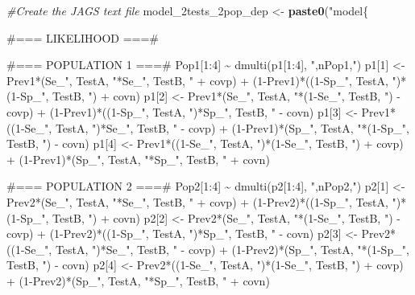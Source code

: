\documentclass[
]{book}
\newenvironment{Shaded}{\begin{snugshade}}{\end{snugshade}}
\newcommand{\CommentTok}[1]{\textcolor[rgb]{0.56,0.35,0.01}{\textit{#1}}}
\newcommand{\FunctionTok}[1]{\textcolor[rgb]{0.13,0.29,0.53}{\textbf{#1}}}
\newcommand{\NormalTok}[1]{#1}
\newcommand{\OtherTok}[1]{\textcolor[rgb]{0.56,0.35,0.01}{#1}}
\newcommand{\StringTok}[1]{\textcolor[rgb]{0.31,0.60,0.02}{#1}}
\begin{document}
\begin{Shaded}
\begin{Highlighting}[]
\CommentTok{\#Create the JAGS text file}
\NormalTok{model\_2tests\_2pop\_dep }\OtherTok{\textless{}{-}} \FunctionTok{paste0}\NormalTok{(}\StringTok{"model\{}

\StringTok{\#=== LIKELIHOOD ===\#}

\StringTok{  \#=== POPULATION 1 ===\#}
\StringTok{  Pop1[1:4] \textasciitilde{} dmulti(p1[1:4], "}\NormalTok{,nPop1,}\StringTok{")}
\StringTok{  p1[1] \textless{}{-} Prev1*(Se\_"}\NormalTok{, TestA, }\StringTok{"*Se\_"}\NormalTok{, TestB, }\StringTok{" + covp) + (1{-}Prev1)*((1{-}Sp\_"}\NormalTok{, TestA, }\StringTok{")*(1{-}Sp\_"}\NormalTok{, TestB, }\StringTok{") + covn)}
\StringTok{  p1[2] \textless{}{-} Prev1*(Se\_"}\NormalTok{, TestA, }\StringTok{"*(1{-}Se\_"}\NormalTok{, TestB, }\StringTok{") {-} covp) + (1{-}Prev1)*((1{-}Sp\_"}\NormalTok{, TestA, }\StringTok{")*Sp\_"}\NormalTok{, TestB, }\StringTok{" {-} covn)}
\StringTok{  p1[3] \textless{}{-} Prev1*((1{-}Se\_"}\NormalTok{, TestA, }\StringTok{")*Se\_"}\NormalTok{, TestB, }\StringTok{" {-} covp) + (1{-}Prev1)*(Sp\_"}\NormalTok{, TestA, }\StringTok{"*(1{-}Sp\_"}\NormalTok{, TestB, }\StringTok{") {-} covn)}
\StringTok{  p1[4] \textless{}{-} Prev1*((1{-}Se\_"}\NormalTok{, TestA, }\StringTok{")*(1{-}Se\_"}\NormalTok{, TestB, }\StringTok{") + covp) + (1{-}Prev1)*(Sp\_"}\NormalTok{, TestA, }\StringTok{"*Sp\_"}\NormalTok{, TestB, }\StringTok{" + covn)}

\StringTok{  \#=== POPULATION 2 ===\#  }
\StringTok{  Pop2[1:4] \textasciitilde{} dmulti(p2[1:4], "}\NormalTok{,nPop2,}\StringTok{")}
\StringTok{  p2[1] \textless{}{-} Prev2*(Se\_"}\NormalTok{, TestA, }\StringTok{"*Se\_"}\NormalTok{, TestB, }\StringTok{" + covp) + (1{-}Prev2)*((1{-}Sp\_"}\NormalTok{, TestA, }\StringTok{")*(1{-}Sp\_"}\NormalTok{, TestB, }\StringTok{") + covn)}
\StringTok{  p2[2] \textless{}{-} Prev2*(Se\_"}\NormalTok{, TestA, }\StringTok{"*(1{-}Se\_"}\NormalTok{, TestB, }\StringTok{") {-} covp) + (1{-}Prev2)*((1{-}Sp\_"}\NormalTok{, TestA, }\StringTok{")*Sp\_"}\NormalTok{, TestB, }\StringTok{" {-} covn)}
\StringTok{  p2[3] \textless{}{-} Prev2*((1{-}Se\_"}\NormalTok{, TestA, }\StringTok{")*Se\_"}\NormalTok{, TestB, }\StringTok{" {-} covp) + (1{-}Prev2)*(Sp\_"}\NormalTok{, TestA, }\StringTok{"*(1{-}Sp\_"}\NormalTok{, TestB, }\StringTok{") {-} covn)}
\StringTok{  p2[4] \textless{}{-} Prev2*((1{-}Se\_"}\NormalTok{, TestA, }\StringTok{")*(1{-}Se\_"}\NormalTok{, TestB, }\StringTok{") + covp) + (1{-}Prev2)*(Sp\_"}\NormalTok{, TestA, }\StringTok{"*Sp\_"}\NormalTok{, TestB, }\StringTok{" + covn)}


\end{Highlighting}
\end{Shaded}
\end{document}
